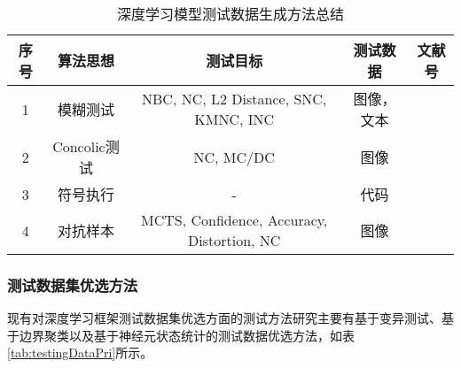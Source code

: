 \begin{table}[t]
	\small
	\centering
	\caption{深度学习模型测试数据生成方法总结}
	\label{tab:testingDataGen}
	\begin{tabular}{ccccc}
		\toprule
		\textbf{序号} & \textbf{算法思想} & \textbf{测试目标}\centering & \textbf{测试数据} & \textbf{文献号} \\
		\midrule
		1 & 模糊测试 & NBC, NC, L2 Distance, SNC, KMNC, INC\centering & 图像，文本 & \cite{Odena2019TensorFuzz,Guo2018DLFuzz,xie2019coverage} \\
		2 & Concolic测试 & NC, MC/DC\centering & 图像 & \cite{Sun2018Concolic} \\
		3 & 符号执行 & -\centering & 代码 & \cite{Gopinath2018Symbolic} \\
		4 & 对抗样本 & MCTS, Confidence, Accuracy, Distortion, NC\centering & 图像 & \cite{Xiao2018Spatially,Wicker2018FeatureGuided,He2018Decision} \\
		\bottomrule
	\end{tabular}
\end{table}





\subsubsection{测试数据集优选方法}

现有对深度学习框架测试数据集优选方面的测试方法研究主要有基于变异测试、基于边界聚类以及基于神经元状态统计的测试数据优选方法，如表\cref{tab:testingDataPri}所示。

